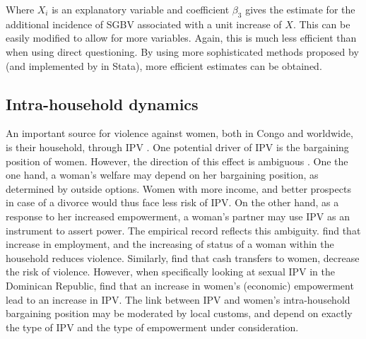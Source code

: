 \documentclass[11pt,a4paper]{scrartcl} %
\newcommand{\tableloc}{C:/Users/Koen/Dropbox/PhD/Papers/CongoGBV/Tables}
\begin{document}
Where \(X_i\) is an explanatory variable and coefficient \(\beta_3\) gives the estimate for the additional incidence of SGBV associated with a unit increase of \(X\). This can be easily modified to allow for more variables. Again, this is much less efficient than when using direct questioning. By using more sophisticated methods proposed by \citet{Imai2011} (and implemented by \cite{Tsai2019} in Stata), more efficient estimates can be obtained. 

\newcommand{\summstat}[2]{\csvreader[filter strcmp={\var}{#1}]{\tableloc/balance.csv}{var=\var,#2=\stat}{\stat}}



\subsection*{Intra-household dynamics}
An important source for violence against women, both in Congo and worldwide, is their household, through IPV \citep{Peterman2011}. One potential driver of IPV is the bargaining position of women. However, the direction of this effect is ambiguous \citep{Eswaran2011}. One the one hand, a woman's welfare may depend on her bargaining position, as determined by outside options. Women with more income, and better prospects in case of a divorce would thus face less risk of IPV. On the other hand, as a response to her increased empowerment, a  woman's partner may use IPV as an instrument to assert power. The empirical record reflects this ambiguity. \cite{Bhattacharya} find that increase in employment, and the increasing of status of a woman within the household reduces violence. Similarly, \cite{Hidrobo2016} find that cash transfers to women, decrease the risk of violence. However, when specifically looking at sexual IPV in the Dominican Republic, \cite{Bueno2017} find that an increase in women's (economic) empowerment lead to an increase in IPV. The link between IPV and women's intra-household bargaining position may be moderated by local customs, and depend on exactly the type of IPV and the type of empowerment under consideration.
\end{document}
